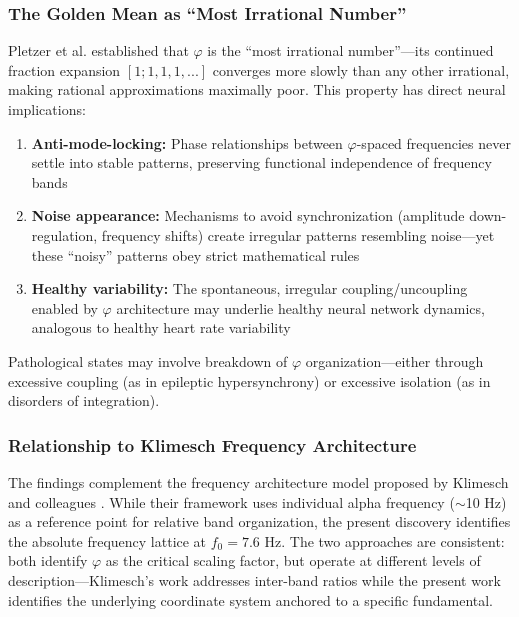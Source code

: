 \documentclass[11pt,a4paper]{article}
\newcommand{\phisym}{\varphi}
\begin{document}
\subsubsection{The Golden Mean as ``Most Irrational Number''}

Pletzer et al. \parencite{pletzer2010golden} established that $\phisym$ is the ``most irrational number''---its continued fraction expansion $[1; 1, 1, 1, ...]$ converges more slowly than any other irrational, making rational approximations maximally poor. This property has direct neural implications:

\begin{enumerate}
    \item \textbf{Anti-mode-locking:} Phase relationships between $\phisym$-spaced frequencies never settle into stable patterns, preserving functional independence of frequency bands
    \item \textbf{Noise appearance:} Mechanisms to avoid synchronization (amplitude down-regulation, frequency shifts) create irregular patterns resembling noise---yet these ``noisy'' patterns obey strict mathematical rules
    \item \textbf{Healthy variability:} The spontaneous, irregular coupling/uncoupling enabled by $\phisym$ architecture may underlie healthy neural network dynamics, analogous to healthy heart rate variability
\end{enumerate}

Pathological states may involve breakdown of $\phisym$ organization---either through excessive coupling (as in epileptic hypersynchrony) or excessive isolation (as in disorders of integration).

\subsubsection{Relationship to Klimesch Frequency Architecture}

The findings complement the frequency architecture model proposed by Klimesch and colleagues \parencite{pletzer2010golden, klimesch2013algorithm}. While their framework uses individual alpha frequency ($\sim$10 Hz) as a reference point for relative band organization, the present discovery identifies the absolute frequency lattice at $f_0 = 7.6$ Hz. The two approaches are consistent: both identify $\phisym$ as the critical scaling factor, but operate at different levels of description---Klimesch's work addresses inter-band ratios while the present work identifies the underlying coordinate system anchored to a specific fundamental.
\end{document}
